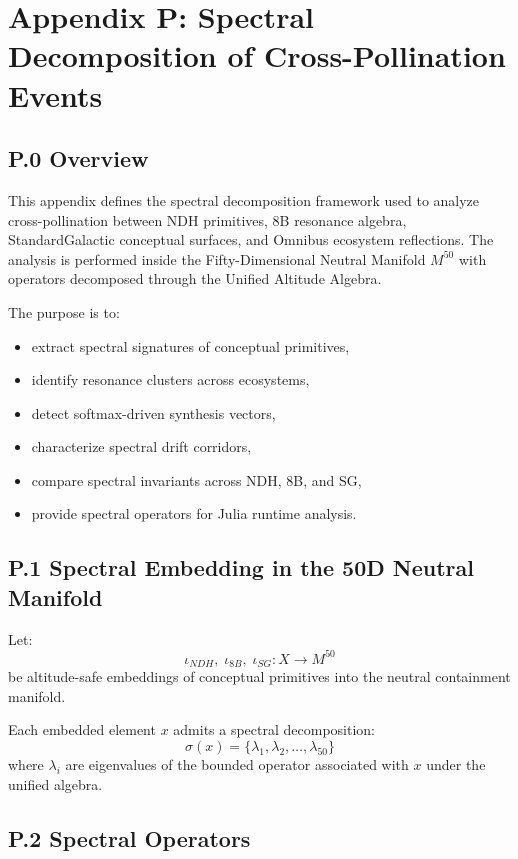 \appendix
\section*{Appendix P: Spectral Decomposition of Cross-Pollination Events}

\subsection*{P.0 Overview}

This appendix defines the spectral decomposition framework used to
analyze cross-pollination between NDH primitives, 8B resonance algebra,
StandardGalactic conceptual surfaces, and Omnibus ecosystem reflections.
The analysis is performed inside the Fifty-Dimensional Neutral Manifold
$M^{50}$ with operators decomposed through the Unified Altitude Algebra.

The purpose is to:
\begin{itemize}
    \item extract spectral signatures of conceptual primitives,
    \item identify resonance clusters across ecosystems,
    \item detect softmax-driven synthesis vectors,
    \item characterize spectral drift corridors,
    \item compare spectral invariants across NDH, 8B, and SG,
    \item provide spectral operators for Julia runtime analysis.
\end{itemize}

\subsection*{P.1 Spectral Embedding in the 50D Neutral Manifold}

Let:
\[
\iota_{NDH},\; \iota_{8B},\; \iota_{SG} : X \to M^{50}
\]
be altitude-safe embeddings of conceptual primitives into the neutral
containment manifold.

Each embedded element $x$ admits a spectral decomposition:
\[
\sigma(x) = \{\lambda_1, \lambda_2, \dots, \lambda_{50}\}
\]
where $\lambda_i$ are eigenvalues of the bounded operator associated with
$x$ under the unified algebra.

\subsection*{P.2 Spectral Operators}

